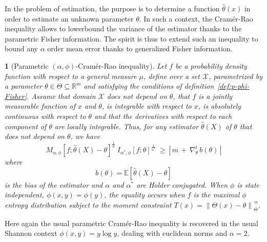 \documentclass[english,sort&compress]{elsarticle}
\theoremstyle{definition}
\theoremstyle{plain}
\newtheorem{prop}{\protect\propositionname}
\theoremstyle{plain}
\providecommand{\propositionname}{Proposition}
\def\Rset{\mathbb{R}}
\def\X{\mathcal{X}}
\newcommand{\Esp}[1]{\mathbb{E}\left[ #1 \right]}
\begin{document}
In  the  problem  of  estimation,   the  purpose  is  to  determine  a  function
$\hat{\theta}(x)$ in order to estimate  an unknown parameter $\theta$. In such a
context, the  Cram\'er-Rao inequality allows  to lowerbound the variance  of the
estimator thanks  to the  parametric Fisher information.  The spirit is  thus to
extend  such an  inequality to  bound any  $\alpha$ order  mean error  thanks to
generalized Fisher information.
%
\begin{prop}[Parametric $(\alpha,\phi)$-Cram\'er-Rao inequality]\label{prop:p-phi-CR}
  Let $f$  be a probability density  function with respect to  a general measure
  $\mu$, define over a set $\X$,  parametrized by a parameter $\theta \in \Theta
  \subseteq      \Rset^m$     and      satisfying     the      conditions     of
  definition~\ref{def:p-phi-Fisher}. Assume that domain  $\X$ does not depend on
  $\theta$, that  $f$ is a jointly  measurable function of $x$  and $\theta$, is
  integrable  with respect  to $x$,  is  absolutely continuous  with respect  to
  $\theta$ and that  the derivatives with respect to  each component of $\theta$
  are  locally  integrable. Thus,  for  any  estimator $\widehat{\theta}(X)$  of
  $\theta$ that does not depend on $\theta$, we have
  \begin{equation}\label{eq:phi-CR}
  M_{\alpha,\phi} \! \left[ f ; \widehat{\theta}(X) - \theta
  \right]^{\frac{1}{\alpha}} \: I_{\alpha^*\!,\phi}[f;\theta]^{\frac{1}{\alpha^*}}
  \: \ge \: \left| \, m \, + \, \nabla_\theta^t \, b(\theta) \, \right|
  \end{equation}
  where
  \begin{equation}
  b(\theta) = \Esp{\widehat{\theta}(X) - \theta}
  \end{equation}
  is  the  bias  of  the  estimator  and  $\alpha$  and  $\alpha^*$  are  Holder
  conjugated.   When $\phi$  is state  independent, $\phi(x,y)  =  \phi(y)$, the
  equality occurs when $f$ is the maximal $\phi$ entropy distribution subject to
  the moment constraint $T(x) = \left\| \Theta(x) - \theta \right\|_{\Theta}^{\,
    \alpha}$.
\end{prop}
%
Here again  the usual parametric  Cram\'er-Rao inequality is recovered  in the
usual Shannon context  $\phi(x,y) = y \log y$, dealing  with euclidean norms and
$\alpha = 2$.
\end{document}
